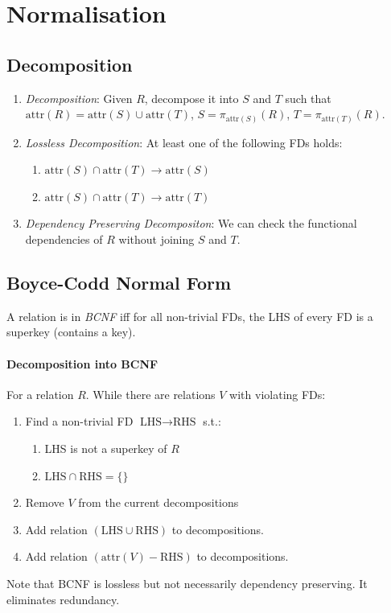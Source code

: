 \documentclass[twocolumn,english]{article}
\begin{document}
\section{Normalisation}


\subsection{Decomposition}
\begin{enumerate}
\item \emph{Decomposition}: Given $R$, decompose it into $S$ and $T$
such that $\mbox{attr}\left(R\right)=\mbox{attr}\left(S\right)\cup\mbox{attr}\left(T\right)$,
$S=\pi_{\mbox{attr}\left(S\right)}\left(R\right)$, $T=\pi_{\mbox{attr}\left(T\right)}\left(R\right)$. 
\item \emph{Lossless Decomposition}: At least one of the following FDs holds:

\begin{enumerate}
\item $\mbox{attr}\left(S\right)\cap\mbox{attr}\left(T\right)\rightarrow\mbox{attr}\left(S\right)$ 
\item $\mbox{attr}\left(S\right)\cap\mbox{attr}\left(T\right)\rightarrow\mbox{attr}\left(T\right)$ 
\end{enumerate}
\item \emph{Dependency Preserving Decompositon}: We can check the functional
dependencies of $R$ without joining $S$ and $T$. 
\end{enumerate}

\subsection{Boyce-Codd Normal Form}

A relation is in \emph{BCNF} iff for all non-trivial FDs, the LHS
of every FD is a superkey (contains a key).


\paragraph{Decomposition into BCNF}

For a relation $R$. While there are relations $V$ with violating
FDs: 
\begin{enumerate}
\item Find a non-trivial FD $\mbox{LHS}\rightarrow\mbox{RHS}$ s.t.:

\begin{enumerate}
\item LHS is not a superkey of $R$ 
\item $\mbox{LHS}\cap\mbox{RHS}=\{\}$ 
\end{enumerate}
\item Remove $V$ from the current decompositions 
\item Add relation $\left(\mbox{LHS}\cup\mbox{RHS}\right)$ to decompositions. 
\item Add relation $\left(\mbox{attr}\left(V\right)-\mbox{RHS}\right)$
to decompositions. 
\end{enumerate}
Note that BCNF is lossless but not necessarily dependency preserving.
It eliminates redundancy.
\end{document}
